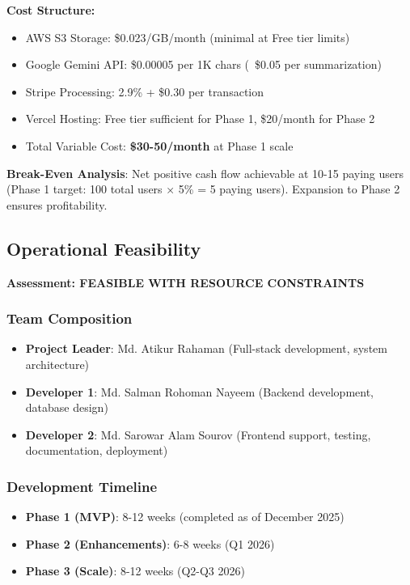 \textbf{Cost Structure:}
\begin{itemize}
    \item AWS S3 Storage: \$0.023/GB/month (minimal at Free tier limits)
    \item Google Gemini API: \$0.00005 per 1K chars (~\$0.05 per summarization)
    \item Stripe Processing: 2.9\% + \$0.30 per transaction
    \item Vercel Hosting: Free tier sufficient for Phase 1, \$20/month for Phase 2
    \item Total Variable Cost: \textbf{\$30-50/month} at Phase 1 scale
\end{itemize}

\textbf{Break-Even Analysis}: Net positive cash flow achievable at 10-15 paying users (Phase 1 target: 100 total users × 5\% = 5 paying users). Expansion to Phase 2 ensures profitability.

\subsection{Operational Feasibility}

\textbf{Assessment: FEASIBLE WITH RESOURCE CONSTRAINTS}

\subsubsection{Team Composition}
\begin{itemize}
    \item \textbf{Project Leader}: Md. Atikur Rahaman (Full-stack development, system architecture)
    \item \textbf{Developer 1}: Md. Salman Rohoman Nayeem (Backend development, database design)
    \item \textbf{Developer 2}: Md. Sarowar Alam Sourov (Frontend support, testing, documentation, deployment)
\end{itemize}

\subsubsection{Development Timeline}
\begin{itemize}
    \item \textbf{Phase 1 (MVP)}: 8-12 weeks (completed as of December 2025)
    \item \textbf{Phase 2 (Enhancements)}: 6-8 weeks (Q1 2026)
    \item \textbf{Phase 3 (Scale)}: 8-12 weeks (Q2-Q3 2026)
\end{itemize}

